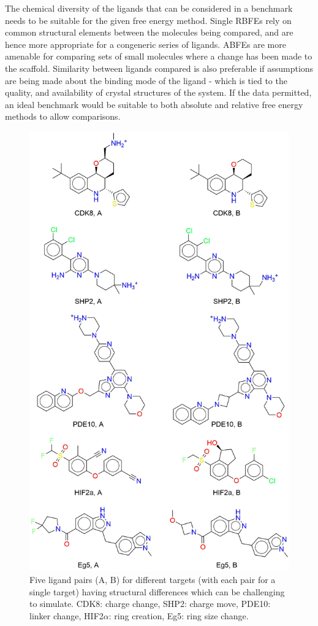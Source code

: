 \documentclass[9pt,bestpractices]{livecoms}
\begin{document}
The chemical diversity of the ligands that can be considered in a benchmark needs to be suitable for the given free energy method. Single RBFEs rely on common structural elements between the molecules being compared, and are hence more appropriate for a congeneric series of ligands. 
%
ABFEs are more amenable for comparing sets of small molecules where a change has been made to the scaffold. Similarity between ligands compared is also preferable if assumptions are being made about the binding mode of the ligand - which is tied to the quality, and availability of crystal structures of the system. If the data permitted, an ideal benchmark would be suitable to both absolute and relative free energy methods to allow comparisons.

\begin{figure}
    \centering
    \includegraphics[width=.48\textwidth]{dataset/difficult_perturbations.png}
    \caption{Five ligand pairs (A, B) for different targets (with each pair for a single target)
    having structural differences which can be challenging to simulate.
    CDK8: charge change,
    SHP2: charge move,
    PDE10: linker change,
    HIF2$\alpha$: ring creation,
    Eg5: ring size change. 
    }
    \label{fig:difficult_perturbations}
\end{figure}
\end{document}
